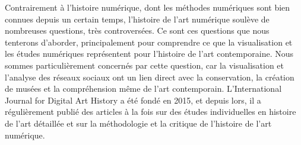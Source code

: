 \documentclass[a4paper, twoside, 12pt]{book}
\begin{document}
Contrairement à l'histoire numérique, dont les méthodes numériques sont bien connues depuis un certain temps, l'histoire de l'art numérique soulève de nombreuses questions, très controversées. Ce sont ces questions que nous tenterons d'aborder, principalement pour comprendre ce que la visualisation et les études numériques représentent pour l'histoire de l'art contemporaine. Nous sommes particulièrement concernés par cette question, car la visualisation et l'analyse des réseaux sociaux ont un lien direct avec la conservation, la création de musées et la compréhension même de l'art contemporain. L'International Journal for Digital Art History a été fondé en 2015, et depuis lors, il a régulièrement publié des articles à la fois sur des études individuelles en histoire de l'art détaillée et sur la méthodologie et la critique de l'histoire de l'art numérique.\\
\end{document}

